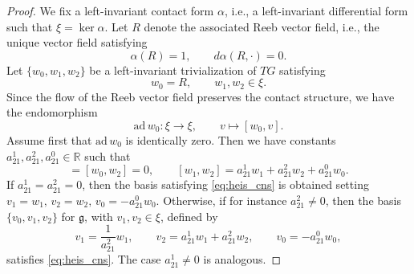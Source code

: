 \documentclass[reqno]{amsart}
\theoremstyle{remark}
\theoremstyle{plain}
\begin{document}
\begin{proof}
    We fix a left-invariant contact form $\alpha$, i.e., a left-invariant differential form such that $\xi=\ker\alpha$. Let $R$ denote the associated Reeb vector field, i.e., the unique vector field satisfying 
    \begin{equation}
        \alpha(R)=1,\qquad d\alpha(R,\cdot)=0.
    \end{equation}
    Let $\{w_0,w_1,w_2\}$ be a left-invariant trivialization of $TG$ satisfying
    \begin{equation}\label{eq:adapp_frame}
        w_0=R,\qquad w_1,w_2\in\xi.
    \end{equation}
    Since the flow of the Reeb vector field preserves the contact structure, we have the endomorphism
    \begin{equation}\label{eq:end_w_0}
        \mathrm{ad}\,w_0:\xi\to\xi,\qquad v\mapsto[w_0,v].
    \end{equation}
    Assume first that $\mathrm{ad}\,w_0$ is identically zero. Then we have constants $a_{21}^1,a_{21}^2,a_{21}^0\in\mathbb R$ such that 
    \begin{equation}
        [w_0,w_1]=[w_0,w_2]=0,\qquad [w_1,w_2]=a_{21}^1w_1+a_{21}^2w_2+a_{21}^0w_0.
    \end{equation}
    If $a_{21}^1=a_{21}^2=0$, then the basis satisfying \eqref{eq:heis_cns} is obtained setting $v_1=w_1,\,v_2=w_2,\,v_0=-a_{21}^0w_0$.
    Otherwise, if for instance $a_{21}^2\neq 0$, then the basis $\{v_0,v_1,v_2\}$ for $\mathfrak g$, with $v_1,v_2\in\xi$, defined by 
    \begin{equation}
     v_1=\frac{1}{a_{21}^2}w_1,\qquad v_2=a_{21}^1w_1+a_{21}^2w_2,\qquad v_0=-a_{21}^0w_0,
    \end{equation}
    satisfies \eqref{eq:heis_cns}. The case $a_{21}^1\neq 0$ is analogous.
    

\end{proof}
\end{document}

